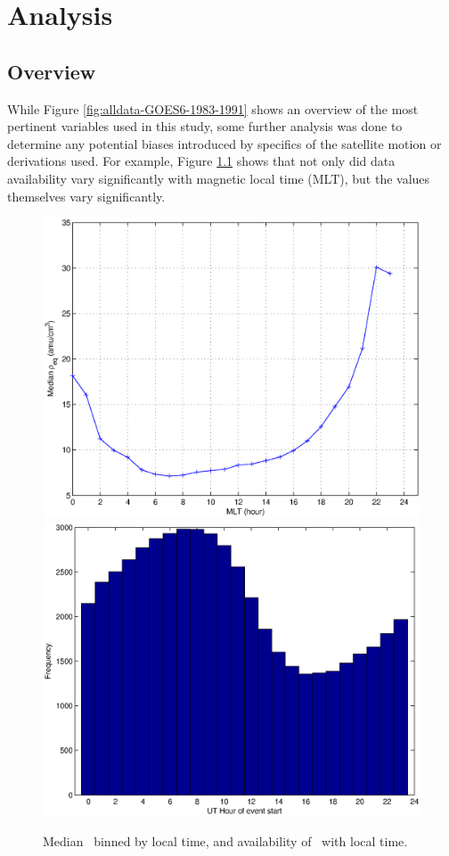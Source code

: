 \chapter[Analysis]{Analysis}

\section{Overview}
While Figure \ref{fig:alldata-GOES6-1983-1991} shows an overview of the most pertinent variables used in this study, some further analysis was done to determine any potential biases introduced by specifics of the satellite motion or derivations used. For example, Figure \ref{fig:ByHourExample} shows that not only did data availability vary significantly with magnetic local time (MLT), but the values themselves vary significantly. 

\begin{figure}[htp!]
\centering
\includegraphics[width=0.7\linewidth]{Figures/rhoMLT.eps}
\includegraphics[width=0.7\linewidth]{Figures/nansbyhour.eps}
\caption{Median \req\ binned by local time, and availability of \req\ with local time.}
\label{fig:ByHourExample}
\end{figure}


